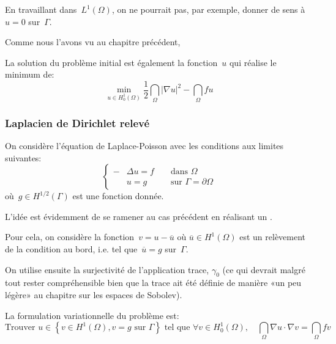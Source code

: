En travaillant dans~$L^1(\Omega)$, on ne pourrait pas, par exemple, donner de sens à~$u = 0$ sur~$\Gamma$.

\medskip
Comme nous l'avons vu au chapitre précédent, 

La solution du problème initial est également la fonction~$u$ qui réalise le minimum de:
\begin{equation}
\min_{u\in H^1_0(\Omega)} \dfrac12\dint_\Omega |\nabla u|^2-\dint_\Omega fu
\end{equation}

\medskip
\subsubsection{Laplacien de Dirichlet relevé}
On considère l'équation de Laplace-Poisson avec les conditions aux limites suivantes:
\begin{equation}\left\{\begin{aligned}
-&\Delta u=f &&\text{ dans } \Omega\\
&u=g &&\text{ sur } \Gamma=\partial\Omega
\end{aligned}
\right.
\end{equation}
où~$g\in H^{1/2}(\Gamma)$ est une fonction donnée.

\medskip
L'idée est évidemment de se ramener au cas précédent en réalisant un .

Pour cela, on considère la fonction~$v = u - \overline{u}$ où $\overline{u}\in H^1(\Omega)$ est un relèvement de la condition au bord, i.e. tel que~$\overline{u}=g$ sur~$\Gamma$.

On utilise ensuite la surjectivité de l'application trace, $\gamma_0$ (ce qui devrait malgré tout rester compréhensible bien que la trace ait été définie de manière «un peu légère» au chapitre sur les espaces de Sobolev).

\medskip
La formulation variationnelle du problème est:
\begin{equation}
\text{Trouver } u \in \left\{ v\in H^1(\Omega), v=g \text{ sur } \Gamma\right\}
 \text{ tel que }
\forall v\in H^1_0(\Omega),
\quad\dint_\Omega \nabla u\cdot\nabla v = \dint_\Omega fv
\end{equation}

